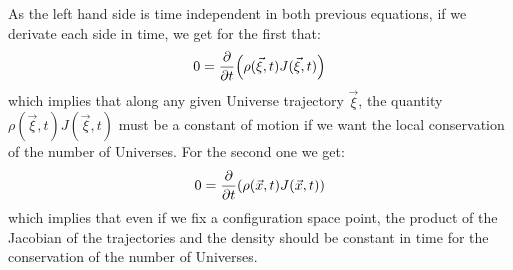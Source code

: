 \documentclass[11pt, a4paper]{article} %
\begin{document}
As the left hand side is time independent in both previous equations, if we derivate each side in time, we get for the first that:
\begin{equation}\label{argitzapena}
0=\pdv{}{t}\qty( \rho(\vec{\xi},t) J(\vec{\xi},t))
\end{equation}
which implies that along any given Universe trajectory $\vec{\xi}$, the quantity $\rho(\vec{\xi},t) J(\vec{\xi},t)$ must be a constant of motion if we want the local conservation of the number of Universes. For the second one we get:
\begin{equation}\label{argitzapena2}
0=\pdv{}{t}\qty( \rho(\vec{x},t) J(\vec{x},t))
\end{equation}
which implies that even if we fix a configuration space point, the product of the Jacobian of the trajectories and the density should be constant in time for the conservation of the number of Universes.
\end{document}
